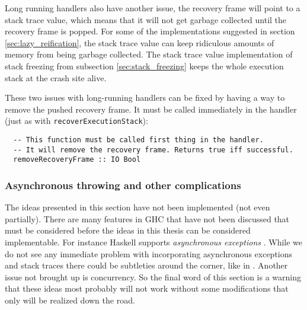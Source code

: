 Long running handlers also have another issue, the
recovery frame will point to a stack trace value, which means that it
will not get garbage collected until the recovery frame is
popped. For some of the implementations suggested in section
\ref{sec:lazy_reification}, the stack trace value can keep ridiculous
amounts of memory from being garbage collected. The stack trace value
implementation of stack freezing from subsection
\ref{sec:stack_freezing} keeps the whole execution stack at the crash
site alive.

These two issues with long-running handlers can be fixed by having a
way to remove the pushed recovery frame. It must be called immediately
in the handler (just as with \texttt{recoverExecutionStack}):

\begin{verbatim}
  -- This function must be called first thing in the handler. 
  -- It will remove the recovery frame. Returns true iff successful.
  removeRecoveryFrame :: IO Bool
\end{verbatim}

\subsubsection{Asynchronous throwing and other complications}

The ideas presented in this section have not been implemented (not
even partially). There are many features in GHC that have not been
discussed that must be considered before the ideas in this thesis
can be considered implementable. For instance Haskell supports
\emph{asynchronous exceptions} \cite{marlow2001asynchronous}. While
we do not see any immediate problem with incorporating asynchronous
exceptions and stack traces there could be subtleties around the corner,
like in \cite{edsko_dark_corners_of_throwTo}. Another issue not brought
up is concurrency. So the final word of this section is a warning that
these ideas most probably will not work without some modifications that
only will be realized down the road.
